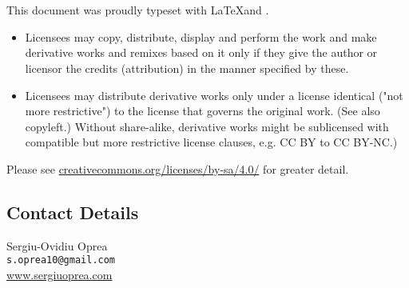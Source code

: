 \chapter*{}

This document was proudly typeset with \LaTeX and \TikZ.

\vspace{2 em}

\doclicenseThis

\begin{itemize}
    \item Licensees may copy, distribute, display and perform the work and make derivative works and remixes based on it only if they give the author or licensor the credits (attribution) in the manner specified by these. 
    \item Licensees may distribute derivative works only under a license identical ("not more restrictive") to the license that governs the original work. (See also copyleft.) Without share-alike, derivative works might be sublicensed with compatible but more restrictive license clauses, e.g. CC BY to CC BY-NC.)
\end{itemize}

Please see \url{creativecommons.org/licenses/by-sa/4.0/} for greater detail.

\vfill

\section*{Contact Details}

Sergiu-Ovidiu Oprea\\
\texttt{s.oprea10@gmail.com}\\
\url{www.sergiuoprea.com}
